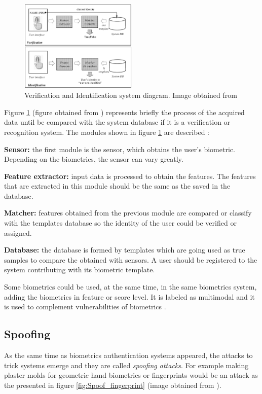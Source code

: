 \begin{figure}[htb]
\centering
\includegraphics[width=0.5\textwidth]{images_miscelaneus/verif_identif.PNG}
\caption{Verification and Identification system diagram. Image obtained from \cite{Intro_biometrics2}} \label{fig:Verif_ident}
\end{figure}

Figure \ref{fig:Verif_ident} (figure obtained from \cite{Intro_biometrics2}) represents briefly the process of the acquired data until be compared  with the system database if it is a verification or recognition system. The modules shown in figure \ref{fig:Verif_ident} are described \cite{Intro_biometrics2}:
\begin{description}[itemsep=2pt,topsep=8pt,parsep=0pt,partopsep=20pt]
\item \textbf{Sensor:} the first module is the sensor, which obtains the user's biometric. Depending on the biometrics, the sensor can vary greatly.
\item \textbf{Feature extractor:} input data is processed to obtain the features. The features that are extracted in this module should be the same as the saved in the database.
\item \textbf{Matcher:} features obtained from the previous module are compared or classify with the templates database so the identity of the user could be verified or assigned.
\item \textbf{Database:} the database is formed by templates which are going used as true samples to compare the obtained with sensors. A user should be registered to the system contributing with its biometric template.
\end{description}

Some biometrics could be used, at the same time, in the same biometrics system, adding the biometrics in feature or score level. It is labeled as multimodal and it is used to complement vulnerabilities of biometrics \cite{Spoofing_survey}.

\subsection{Spoofing}
As the same time as biometrics authentication systems appeared, the attacks to trick systems emerge and they are called \textit{spoofing attacks}. For example making plaster molds for geometric hand biometrics or fingerprints would be an attack as the presented in figure \ref{fig:Spoof_fingerprint} (image obtained from \cite{fingerprint_image}).\\

